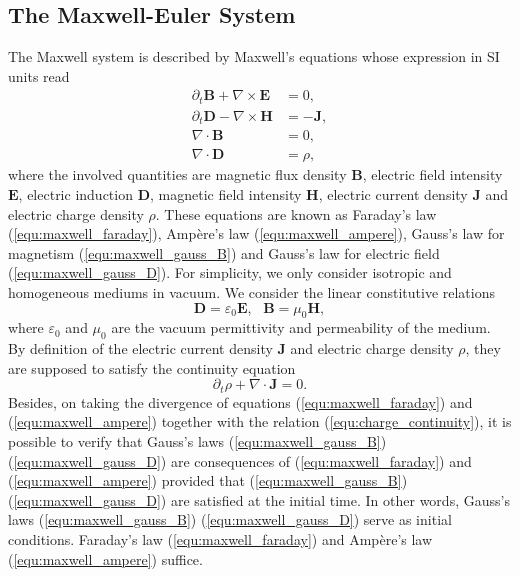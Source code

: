 \documentclass{article}
\begin{document}
\subsection{The Maxwell-Euler System}
The Maxwell system is described by Maxwell's equations whose expression in SI units read
\begin{align}
    \partial_t \mathbf{B} + \nabla \times \mathbf{E} &= 0, \label{equ:maxwell_faraday} \\ 
    \partial_t \mathbf{D} - \nabla \times \mathbf{H} &= -\mathbf{J}, \label{equ:maxwell_ampere} \\
    \nabla \cdot \mathbf{B} &= 0,  \label{equ:maxwell_gauss_B}\\
    \nabla \cdot \mathbf{D} &= \rho, \label{equ:maxwell_gauss_D}
\end{align}
where the involved quantities are magnetic flux density $\mathbf{B}$, electric field intensity $\mathbf{E}$, electric induction $\mathbf{D}$, magnetic field intensity $\mathbf{H}$, electric current density $\mathbf{J}$ and electric charge density $\rho$. These equations are known as Faraday's law (\ref{equ:maxwell_faraday}), Amp\`{e}re's law (\ref{equ:maxwell_ampere}), Gauss's law for magnetism (\ref{equ:maxwell_gauss_B}) and Gauss's law for electric field (\ref{equ:maxwell_gauss_D}). For simplicity, we only consider isotropic and homogeneous mediums in vacuum. We consider the linear constitutive relations 
\begin{equation*}
    \mathbf{D} = \varepsilon_0 \mathbf{E}, \ \ \ \mathbf{B} = \mu_0\mathbf{H}, 
\end{equation*}
where $\varepsilon_0$ and $\mu_0$ are the vacuum permittivity and permeability of the medium. By definition of the electric current density $\mathbf{J}$ and electric charge density $\rho$, they are supposed to satisfy the continuity equation
\begin{equation} \label{equ:charge_continuity}
    \partial_t\rho + \nabla \cdot \mathbf{J} = 0.
\end{equation}
Besides, on taking the divergence of equations (\ref{equ:maxwell_faraday}) and (\ref{equ:maxwell_ampere}) together with the relation (\ref{equ:charge_continuity}), it is possible to verify that Gauss's laws (\ref{equ:maxwell_gauss_B}) (\ref{equ:maxwell_gauss_D}) are consequences of (\ref{equ:maxwell_faraday}) and (\ref{equ:maxwell_ampere}) provided that (\ref{equ:maxwell_gauss_B}) (\ref{equ:maxwell_gauss_D}) are satisfied at the initial time. In other words, Gauss's laws (\ref{equ:maxwell_gauss_B}) (\ref{equ:maxwell_gauss_D}) serve as initial conditions. Faraday's law (\ref{equ:maxwell_faraday}) and Amp\`{e}re's law (\ref{equ:maxwell_ampere}) suffice.
\end{document}
